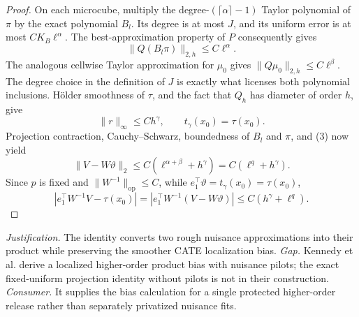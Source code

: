 \documentclass{article}
\begin{document}
\begin{proof}
On each microcube, multiply the degree-\((\lceil\alpha\rceil-1)\) Taylor polynomial of \(\pi\) by the exact polynomial \(B_l\).  Its degree is at most \(J\), and its uniform error is at most \(CK_B\ell^\alpha\).  The best-approximation property of \(P\) consequently gives
\[
 \|Q(B_l\pi)\|_{2,h}\le C\ell^\alpha.
\]
The analogous cellwise Taylor approximation for \(\mu_0\) gives \(\|Q\mu_0\|_{2,h}\le C\ell^\beta\).  The degree choice in the definition of \(J\) is exactly what licenses both polynomial inclusions.  Hölder smoothness of \(\tau\), and the fact that \(Q_h\) has diameter of order \(h\), give
\[
 \|r\|_\infty\le Ch^\gamma,
 \qquad t_\gamma(x_0)=\tau(x_0).
\]
Projection contraction, Cauchy--Schwarz, boundedness of \(B_l\) and \(\pi\), and (3) now yield
\[
 \|V-W\vartheta\|_2\le C(\ell^{\alpha+\beta}+h^\gamma)
 =C(\ell^q+h^\gamma).
\]
Since \(p\) is fixed and \(\|W^{-1}\|_{\mathrm{op}}\le C\), while \(e_1^\top\vartheta=t_\gamma(x_0)=\tau(x_0)\),
\[
 |e_1^\top W^{-1}V-\tau(x_0)|
 =|e_1^\top W^{-1}(V-W\vartheta)|
 \le C(h^\gamma+\ell^q).
\]
\end{proof}
\par\smallskip\noindent \textit{Justification.} The identity converts two rough nuisance approximations into their product while preserving the smoother CATE localization bias. \textit{Gap.} Kennedy et al. derive a localized higher-order product bias with nuisance pilots; the exact fixed-uniform projection identity without pilots is not in their construction. \textit{Consumer.} It supplies the bias calculation for a single protected higher-order release rather than separately privatized nuisance fits.
\end{document}
